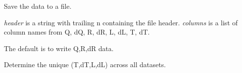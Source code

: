 \documentclass[letterpaper,10pt,english]{sphinxmanual}
\begin{document}
\begin{fulllineitems}
\begin{fulllineitems}
\end{fulllineitems}


\begin{fulllineitems}
\label{api/probe:refl1d.probe.QProbe.write_data}
Save the data to a file.

\emph{header} is a string with trailing n containing the file header.
\emph{columns} is a list of column names from Q, dQ, R, dR, L, dL, T, dT.

The default is to write Q,R,dR data.

\end{fulllineitems}


\end{fulllineitems}


\begin{fulllineitems}
\label{api/probe:refl1d.probe.Qmeasurement_union}
Determine the unique (T,dT,L,dL) across all datasets.

\end{fulllineitems}

\end{document}
